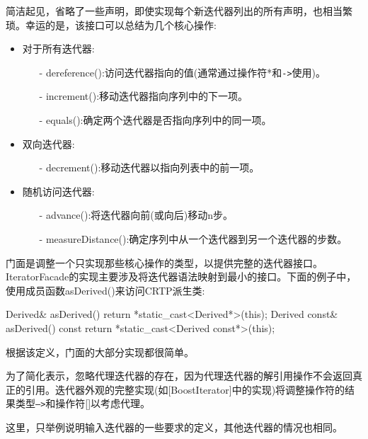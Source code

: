 简洁起见，省略了一些声明，即使实现每个新迭代器列出的所有声明，也相当繁琐。幸运的是，该接口可以总结为几个核心操作:

\begin{itemize}
\item 
对于所有迭代器:
\begin{itemize}
\item [-]
dereference():访问迭代器指向的值(通常通过操作符*和\texttt{->}使用)。

\item [-]
increment():移动迭代器指向序列中的下一项。

\item [-]
equals():确定两个迭代器是否指向序列中的同一项。
\end{itemize}

\item 
双向迭代器:
\begin{itemize}
\item [-]
decrement():移动迭代器以指向列表中的前一项。
\end{itemize}

\item 
随机访问迭代器:
\begin{itemize}
\item [-]
advance():将迭代器向前(或向后)移动n步。

\item [-]
measureDistance():确定序列中从一个迭代器到另一个迭代器的步数。
\end{itemize}
\end{itemize}

门面是调整一个只实现那些核心操作的类型，以提供完整的迭代器接口。IteratorFacade的实现主要涉及将迭代器语法映射到最小的接口。下面的例子中，使用成员函数asDerived()来访问CRTP派生类:

\begin{cpp}
Derived& asDerived() { return *static_cast<Derived*>(this); }
Derived const& asDerived() const {
	return *static_cast<Derived const*>(this);
}
\end{cpp}

根据该定义，门面的大部分实现都很简单。

\begin{notice}
为了简化表示，忽略代理迭代器的存在，因为代理迭代器的解引用操作不会返回真正的引用。迭代器外观的完整实现(如[BoostIterator]中的实现)将调整操作符的结果类型\texttt{—>}和操作符[]以考虑代理。
\end{notice}

这里，只举例说明输入迭代器的一些要求的定义，其他迭代器的情况也相同。


